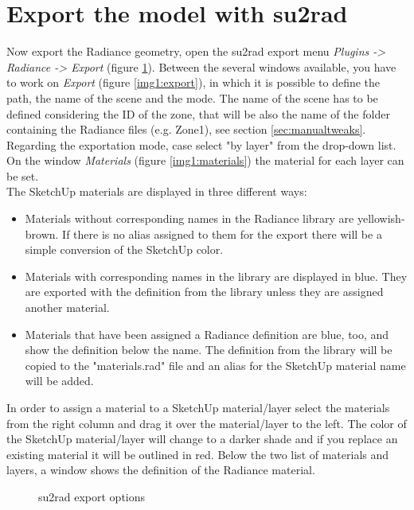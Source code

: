 \section{Export the model with su2rad} \label{sec:export}

Now export the Radiance geometry, open the su2rad export menu \textit{Plugins -> Radiance -> Export} (figure \ref{img1:export_menu}). Between the several windows available, you have to work on \textit{Export} (figure \ref{img1:export}), in which it is possible to define the path, the name of the scene and the mode. The name of the scene has to be defined considering the ID of the zone, that will be also the name of the folder containing the Radiance files (e.g. Zone1), see section \ref{sec:manualtweaks}. Regarding the exportation mode, case select "by layer" from the drop-down list. On the window \textit{Materials} (figure \ref{img1:materials}) the material for each layer can be set. \\
The SketchUp materials are displayed in three different ways:
\begin{itemize}
\renewcommand{\labelitemi}{\tiny$\blacksquare$}
\item Materials without corresponding names in the Radiance library are yellowish-brown. If there is no alias assigned to them for the export there will be a simple conversion of the SketchUp color.
\item Materials with corresponding names in the library are displayed in blue. They are exported with the definition from the library unless they are assigned another material.
\item Materials that have been assigned a Radiance definition are blue, too, and show the definition below the name. The definition from the library will be copied to the "materials.rad" file and an alias for the SketchUp material name will be added.
\end{itemize}
In order to assign a material to a SketchUp material/layer select the materials from the right column and drag it over the material/layer to the left. The color of the SketchUp material/layer will change to a darker shade and if you replace an existing material it will be outlined in red.
Below the two list of materials and layers, a window shows the definition of the Radiance material.

\begin{figure}[h] 
  \caption{\label{img1:export_menu} su2rad export options}
\end{figure}

